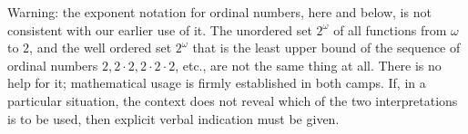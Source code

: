 Warning: the exponent notation for ordinal numbers, here and below, is not consistent with our earlier use of it. The unordered set $2^{\omega}$ of all functions from $\omega$ to $2$, and the well ordered set $2^{\omega}$ that is the least upper bound of the sequence of ordinal numbers $2, 2 \cdot 2, 2 \cdot 2 \cdot 2$, etc., are not the same thing at all. There is no help for it; mathematical usage is firmly established in both camps. If, in a particular situation, the context does not reveal which of the two interpretations is to be used, then explicit verbal indication must be given. 